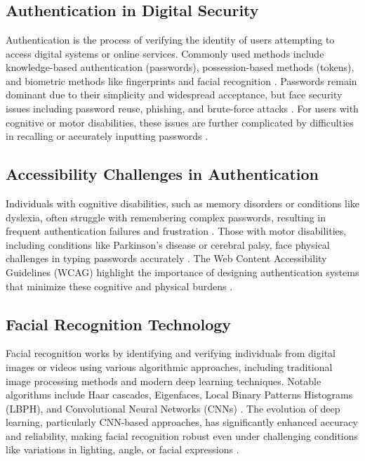 \chapter{}%
\label{ch:stand-van-zaken}



\section{Authentication in Digital Security}
Authentication is the process of verifying the identity of users attempting to access digital systems or online services. 
Commonly used methods include knowledge-based authentication (passwords), possession-based methods (tokens), and 
biometric methods like fingerprints and facial recognition \autocite{Pant2022}. Passwords remain dominant due to 
their simplicity and widespread acceptance, but face security issues including password reuse, phishing, and 
brute-force attacks \autocite{Ophoff2021}. For users with cognitive or motor disabilities, these issues are 
further complicated by difficulties in recalling or accurately inputting passwords \autocite{Rochford2014}.

\section{Accessibility Challenges in Authentication}
Individuals with cognitive disabilities, such as memory disorders or conditions like dyslexia, often struggle with remembering complex passwords, resulting in frequent authentication failures and frustration \autocite{Farid2019, Ophoff2021}. Those with motor disabilities, including conditions like Parkinson's disease or cerebral palsy, face physical challenges in typing passwords accurately \autocite{Renaud2020}. The Web Content Accessibility Guidelines (WCAG) highlight the importance of designing authentication systems that minimize these cognitive and physical burdens \autocite{Brewer2023}.

\vspace{4\baselineskip}
\section{Facial Recognition Technology}
Facial recognition works by identifying and verifying individuals from digital images or videos using various algorithmic approaches, including traditional image processing methods and modern deep learning techniques. Notable algorithms include Haar cascades, Eigenfaces, Local Binary Patterns Histograms (LBPH), and Convolutional Neural Networks (CNNs) \autocite{ElSayed2015}. The evolution of deep learning, particularly CNN-based approaches, has significantly enhanced accuracy and reliability, making facial recognition robust even under challenging conditions like variations in lighting, angle, or facial expressions \autocite{Zhang2020}.

